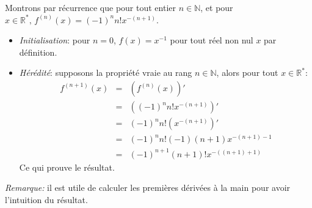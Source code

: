 Montrons par récurrence que pour tout entier $n\in \mathbb{N}$, et pour $x\in \mathbb{R}^*, \, f^{(n)}(x)=(-1)^nn!x^{-(n+1)}$.
\begin{itemize}
  \item \textit{Initialisation}: pour $n=0$, $f(x)=x^{-1}$ pour tout réel non nul $x$ par définition.
  \item \textit{Hérédité}: supposons la propriété vraie au rang $n\in \mathbb{N}$, alors pour tout $x \in \mathbb{R}^*$:
  \begin{eqnarray}
    f^{(n+1)}(x) &=& \left( f^{(n)}(x) \right)'  \nonumber \\
                &=& \left( (-1)^nn!x^{-(n+1)} \right)'  \nonumber \\
                &=& (-1)^nn! \left( x^{-(n+1)} \right)'  \nonumber \\
                &=& (-1)^nn!(-1)(n+1) x^{-(n+1)-1} \nonumber \\
                &=& (-1)^{n+1}(n+1)!x^{-((n+1)+1)} \nonumber 
  \end{eqnarray}
  Ce qui prouve le résultat.
\end{itemize}

\textit{Remarque:} il est utile de calculer les premières dérivées à la main pour avoir l'intuition du résultat.
